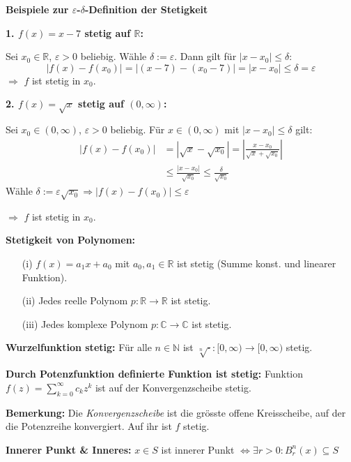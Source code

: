 \begin{itemize}
\textbf{Beispiele zur $\varepsilon$-$\delta$-Definition der Stetigkeit}

\textbf{1. $f(x) = x - 7$ stetig auf $\mathbb{R}$:}

Sei $x_0 \in \mathbb{R}$, $\varepsilon > 0$ beliebig.  
Wähle $\delta := \varepsilon$. Dann gilt für $|x - x_0| \leq \delta$:
\[
|f(x) - f(x_0)| = |(x - 7) - (x_0 - 7)| = |x - x_0| \leq \delta = \varepsilon
\]
$\Rightarrow$ $f$ ist stetig in $x_0$.

\vspace{0.5em}

\textbf{2. $f(x) = \sqrt{x}$ stetig auf $(0, \infty)$:}

Sei $x_0 \in (0, \infty)$, $\varepsilon > 0$ beliebig.  
Für $x \in (0, \infty)$ mit $|x - x_0| \leq \delta$ gilt:
\[
\begin{aligned}
|f(x) - f(x_0)| &= |\sqrt{x} - \sqrt{x_0}| = \left| \frac{x - x_0}{\sqrt{x} + \sqrt{x_0}} \right| \\
&\leq \frac{|x - x_0|}{\sqrt{x_0}} \leq \frac{\delta}{\sqrt{x_0}}
\end{aligned}
\]
Wähle $\delta := \varepsilon \sqrt{x_0} \Rightarrow |f(x) - f(x_0)| \leq \varepsilon$

$\Rightarrow$ $f$ ist stetig in $x_0$.


\textbf{Stetigkeit von Polynomen:}
\begin{itemize}
  \item[(i)] \(f(x) = a_1 x + a_0\) mit \(a_0,a_1 \in \mathbb{R}\) ist stetig (Summe konst. und linearer Funktion).
  \item[(ii)] Jedes reelle Polynom \(p: \mathbb{R} \to \mathbb{R}\) ist stetig.
  \item[(iii)] Jedes komplexe Polynom \(p: \mathbb{C} \to \mathbb{C}\) ist stetig.
\end{itemize}

\textbf{Wurzelfunktion stetig:}  
Für alle \(n \in \mathbb{N}\) ist \(\sqrt[n]{\cdot} : [0,\infty) \to [0,\infty)\) stetig.

\textbf{Durch Potenzfunktion definierte Funktion ist stetig:}  
Funktion \(f(z) = \sum_{k=0}^\infty c_k z^k\) ist auf der Konvergenzscheibe stetig.

\textbf{Bemerkung:}  
Die \textit{Konvergenzscheibe} ist die grösste offene Kreisscheibe, auf der die Potenzreihe konvergiert. Auf ihr ist \(f\) stetig.

\textbf{Innerer Punkt \& Inneres:}  
\(x \in S\) ist innerer Punkt \(\Leftrightarrow \exists r>0: B_r^n(x) \subseteq S\)


\end{itemize}
